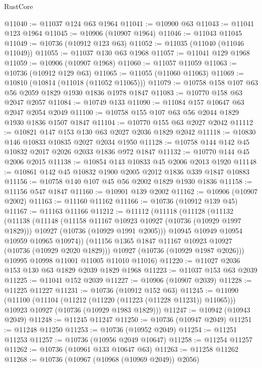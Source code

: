 \begin{lexlean}{RustCore}
\begin{coremodule}
@11040 := @11037 @124 @63 @1964
@11041 := @10900 @63
@11043 := @11041 @123 @1964
@11045 := @10906 (@10907 @1964)
@11046 := @11043 @11045
@11049 := @10736 (@10912 @123 @63)
@11052 := @11035 (@11040 (@11046 @11049))
@11055 := @11037 @130 @63 @1968
@11057 := @11041 @129 @1968
@11059 := @10906 (@10907 @1968)
@11060 := @11057 @11059
@11063 := @10736 (@10912 @129 @63)
@11065 := @11055 (@11060 @11063)
@11069 := @10810 (@10814 (@11018 (@11052 @11065)))
@11079 := @10758 @158 @107 @63 @56 @2059 @1829 @1930 @1836 @1978 @1847
@11083 := @10770 @158 @63 @2047 @2057
@11084 := @10749 @133
@11090 := @11084 @157 @10647 @63 @2047 @2054 @2049
@11100 := @10758 @155 @107 @63 @56 @2044 @1829 @1930 @1836 @1507 @1847
@11104 := @10770 @155 @63 @2027 @2042
@11112 := @10821 @147 @153 @130 @63 @2027 @2036 @1829 @2042
@11118 := @10830 @146 @10833 @10835 @2027 @2034 @1950
@11128 := @10758 @144 @142 @45 @10832 @2017 @2026 @2033 @1836 @972 @1847
@11132 := @10770 @144 @45 @2006 @2015
@11138 := @10854 @143 @10833 @45 @2006 @2013 @1920
@11148 := @10861 @142 @45 @10832 @1900 @2005 @2012 @1836 @339 @1847 @10883
@11156 := @10758 @140 @107 @45 @56 @2002 @1829 @1930 @1836
@11158 := @11156 @547 @1847
@11160 := @10901 @139 @2002
@11162 := @10906 (@10907 @2002)
@11163 := @11160 @11162
@11166 := @10736 (@10912 @139 @45)
@11167 := @11163 @11166
@11212 := @11112
    (@11118
      (@11128
        (@11132
          (@11138
            (@11148
              (@11158 @11167 @10923 @10927 (@10736 (@10929 @1997 @1829)))
              @10927
              (@10736 (@10929 @1991 @2005)))
            @10945
            @10949
            @10954
            @10959
            @10965
            @10974))
        (@11156 @1365 @1847 @11167 @10923 @10927 (@10736 (@10929 @2020 @1829)))
        @10927
        (@10736 (@10929 @1987 @2026)))
      @10995
      @10998
      @11001
      @11005
      @11010
      @11016)
@11220 := @11027 @2036 @153 @130 @63 @1829 @2039 @1829 @1968
@11223 := @11037 @153 @63 @2039
@11225 := @11041 @152 @2039
@11227 := @10906 (@10907 @2039)
@11228 := @11225 @11227
@11231 := @10736 (@10912 @152 @63)
@11245 := @11090
    (@11100
      (@11104 (@11212 (@11220 (@11223 (@11228 @11231)) @11065)))
      @10923
      @10927
      (@10736 (@10929 @1983 @1829)))
@11247 := @10942 (@10943 @2049)
@11248 := @11245 @11247
@11250 := @10736 (@10947 @2049)
@11251 := @11248 @11250
@11253 := @10736 (@10952 @2049)
@11254 := @11251 @11253
@11257 := @10736 (@10956 @2049 @10647)
@11258 := @11254 @11257
@11262 := @10736 (@10961 @133 @10647 @63)
@11263 := @11258 @11262
@11268 := @10736 (@10967 (@10968 (@10969 @2049)) @2056)

\end{coremodule}
\end{lexlean}
